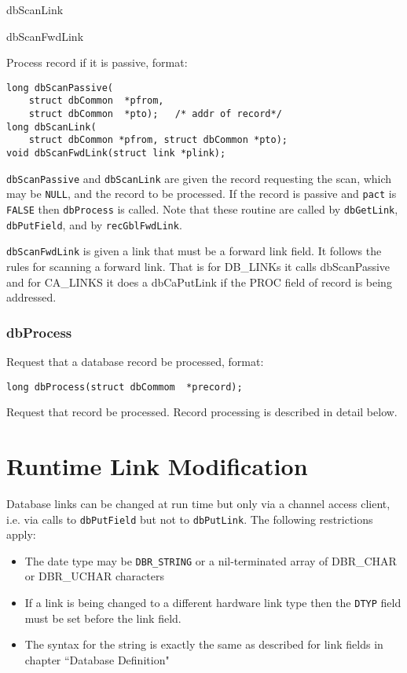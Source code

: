 dbScanLink

dbScanFwdLink

Process record if it is passive, format:

\begin{verbatim}
long dbScanPassive(
    struct dbCommon  *pfrom,
    struct dbCommon  *pto);   /* addr of record*/
long dbScanLink(
    struct dbCommon *pfrom, struct dbCommon *pto);
void dbScanFwdLink(struct link *plink);
\end{verbatim}

 \verb|dbScanPassive| and \verb|dbScanLink| are given the record requesting the scan, which may be \verb|NULL|, and the record to 
be processed. If the record is passive and \verb|pact| is \verb|FALSE| then \verb|dbProcess| is called. Note that these routine are called by 
\verb|dbGetLink|, \verb|dbPutField|, and by \verb|recGblFwdLink|.

\verb|dbScanFwdLink| is given a link that must be a forward link field. It follows the rules for scanning a forward link. That 
is for DB\_LINKs it calls dbScanPassive and for CA\_LINKS it does a dbCaPutLink if the PROC field of record is being 
addressed.

\subsubsection{dbProcess }

Request that a database record be processed, format:

\begin{verbatim}
long dbProcess(struct dbCommom  *precord);
\end{verbatim}

Request that record be processed. Record processing is described in detail below.

\section{Runtime Link Modification}

Database links can be changed at run time but only via a channel access client, i.e. via calls to \verb|dbPutField| but not to 
\verb|dbPutLink|. The following restrictions apply:

\begin{itemize}
\item The date type may be \verb|DBR_STRING| or a nil-terminated array of DBR\_CHAR or DBR\_UCHAR characters

\item If a link is being changed to a different hardware link type then the \verb|DTYP| field must be set before the link field.

\item The syntax for the string is exactly the same as described for link fields in chapter ``Database Definition"

\end{itemize}

